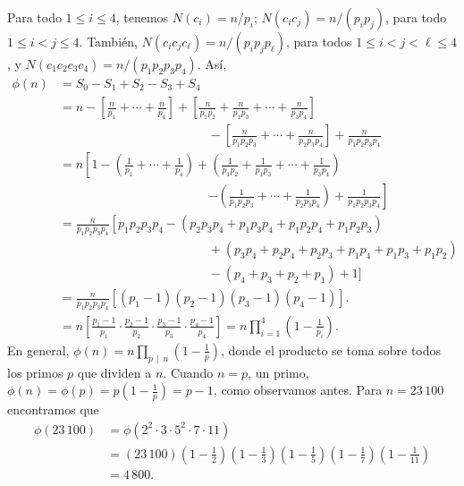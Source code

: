 \begin{myexample}
    Para todo $1 \leq i \leq 4$, tenemos $N\left(c_i\right)=n / p_i$; $N\left(c_i c_j\right)=n /\left(p_i p_j\right)$, para todo $1 \leq i<j \leq 4$. También, $N\left(c_i c_j c_{\ell}\right)=n /\left(p_i p_j p_{\ell}\right)$, para todos $1 \leq i<j<\ell \leq 4$, y $N\left(c_1 c_2 c_3 c_4\right)=n /\left(p_1 p_2 p_3 p_4\right)$. Así,
    \begin{align*}
        \phi(n) & = S_0-S_1+S_2-S_3+S_4 \\
        & = n-\left[\frac{n}{p_1}+\cdots+\frac{n}{p_4}\right]+\left[\frac{n}{p_1 p_2}+\frac{n}{p_1 p_3}+\cdots+\frac{n}{p_3 p_4}\right] \\
        & \hspace{5cm} -\left[\frac{n}{p_1 p_2 p_3}+\cdots+\frac{n}{p_2 p_3 p_4}\right]+\frac{n}{p_1 p_2 p_3 p_4} \\
        & = n\left[1-\left(\frac{1}{p_1}+\cdots+\frac{1}{p_4}\right)+\left(\frac{1}{p_1 p_2}+\frac{1}{p_1 p_3}+\cdots+\frac{1}{p_3 p_4}\right)\right. \\
        & \hspace{5cm} \left.-\left(\frac{1}{p_1 p_2 p_3}+\cdots+\frac{1}{p_2 p_3 p_4}\right)+\frac{1}{p_1 p_2 p_3 p_4}\right] \\
        & = \frac{n}{p_1 p_2 p_3 p_4}\left[p_1 p_2 p_3 p_4-\left(p_2 p_3 p_4+p_1 p_3 p_4+p_1 p_2 p_4+p_1 p_2 p_3\right) \right. \\
        & \hspace{5cm} + \left(p_3 p_4+p_2 p_4+p_2 p_3+p_1 p_4+p_1 p_3+p_1 p_2\right) \\
        & \hspace{5cm} - (p_4 + p_3 + p_2 + p_1) + 1] \\
        & = \frac{n}{p_1 p_2 p_3 p_4}\left[ (p_1 - 1)(p_2 -1)(p_3 - 1)(p_4 - 1)\right]. \\
        & = n\left[\frac{p_1-1}{p_1} \cdot \frac{p_2-1}{p_2} \cdot \frac{p_3-1}{p_3} \cdot \frac{p_4-1}{p_4}\right]=n \prod_{i=1}^4\left(1-\frac{1}{p_i}\right) .
    \end{align*}
    En general, $\displaystyle \phi(n)=n \prod_{p \, \mid \, n}\left(1-\frac{1}{p}\right)$, donde el producto se toma sobre todos los primos $p$ que dividen a $n$. Cuando $n=p$, un primo, $\displaystyle \phi(n)=\phi(p)=p\left(1-\frac{1}{p}\right)=p-1$, como observamos antes. Para $n=23 \, 100$ encontramos que
    \begin{align*}
        \phi(23 \, 100) & =\phi\left(2^2 \cdot 3 \cdot 5^2 \cdot 7 \cdot 11\right) \\
        & = (23 \, 100)\left(1-\frac{1}{2}\right)\left(1-\frac{1}{3}\right)\left(1-\frac{1}{5}\right)\left(1-\frac{1}{7}\right)\left(1-\frac{1}{11}\right) \\
        & =4 \, 800.
    \end{align*}
\end{myexample}


